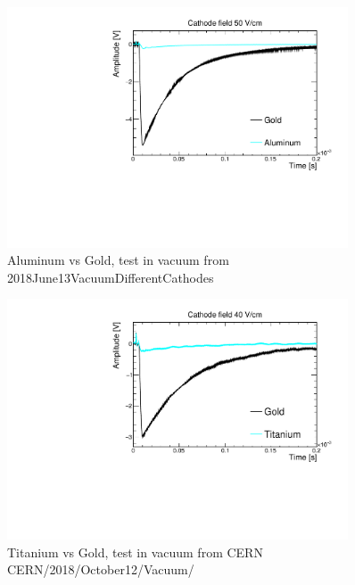 \documentclass[a4paper,11pt]{article}
\begin{document}
\begin{figure}[tb]
	\begin{center}
	\includegraphics[width=0.9\textwidth]{figures/AluminumVSGold_50Vcm.pdf}	
	\caption{Aluminum vs Gold, test in vacuum from 2018June13VacuumDifferentCathodes
	}
	\label{fig:AluminumVSgold}
	\end{center}
\end{figure}


\begin{figure}[tb]
	\begin{center}
	\includegraphics[width=0.9\textwidth]{figures/TitaniumVSGold_40Vcm.pdf}	
	\caption{Titanium vs Gold, test in vacuum from CERN 
	CERN/2018/October12/Vacuum/
	}
	\label{fig:AluminumVSgold}
	\end{center}
\end{figure}


\end{document}
